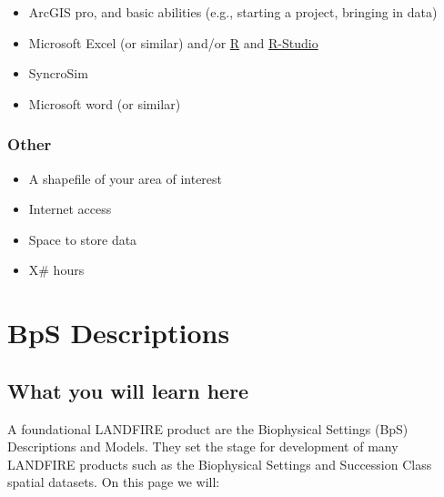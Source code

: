 \documentclass[
  letterpaper,
  DIV=11,
  numbers=noendperiod]{scrreprt}
\providecommand{\tightlist}{%
  \setlength{\itemsep}{0pt}\setlength{\parskip}{0pt}}\usepackage{longtable,booktabs,array}
\begin{document}
\begin{itemize}
\tightlist
\item
  ArcGIS pro, and basic abilities (e.g., starting a project, bringing in
  data)
\item
  Microsoft Excel (or similar) and/or
  \href{https://cran.rstudio.com/}{R} and
  \href{https://posit.co/download/rstudio-desktop/}{R-Studio}
\item
  SyncroSim
\item
  Microsoft word (or similar)
\end{itemize}

\hypertarget{other}{%
\subsection*{Other}\label{other}}

\begin{itemize}
\tightlist
\item
  A shapefile of your area of interest
\item
  Internet access
\item
  Space to store data
\item
  X\# hours
\end{itemize}


\hypertarget{bps-descriptions}{%
\chapter{BpS Descriptions}\label{bps-descriptions}}

\hypertarget{what-you-will-learn-here}{%
\section{What you will learn here}\label{what-you-will-learn-here}}

A foundational LANDFIRE product are the Biophysical Settings (BpS)
Descriptions and Models. They set the stage for development of many
LANDFIRE products such as the Biophysical Settings and Succession Class
spatial datasets. On this page we will:
\end{document}
